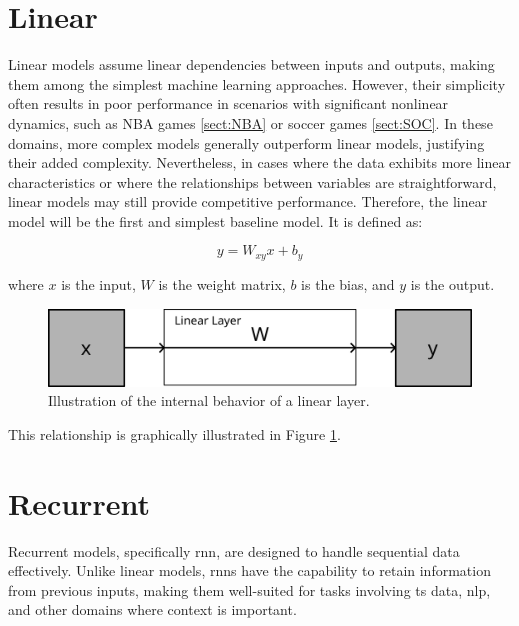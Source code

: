 \section{Linear}
\label{sect:linear}

Linear models assume linear dependencies between inputs and outputs, making them among the simplest machine learning approaches. However, their simplicity often results in poor performance in scenarios with significant nonlinear dynamics, such as NBA games \ref{sect:NBA} or soccer games \ref{sect:SOC}. In these domains, more complex models generally outperform linear models, justifying their added complexity. Nevertheless, in cases where the data exhibits more linear characteristics or where the relationships between variables are straightforward, linear models may still provide competitive performance. Therefore, the linear model will be the first and simplest baseline model. It is defined as:

\begin{equation}
    y = W_{xy}x + b_y
\end{equation}

where \( x \) is the input, \( W \) is the weight matrix, \( b \) is the bias, and \( y \) is the output.

\begin{figure}[t]
    \centering
    \includegraphics[width=\textwidth]{contents/Basics/linear.png}
    \caption{Illustration of the internal behavior of a linear layer.}
    \label{fig:linear-layer}
\end{figure}

 This relationship is graphically illustrated in Figure \ref{fig:linear-layer}.

\section{Recurrent}
\label{sect:rnn}

Recurrent models, specifically \gls{rnn}, are designed to handle sequential data effectively. Unlike linear models, \glspl{rnn} have the capability to retain information from previous inputs, making them well-suited for tasks involving \gls{ts} data, \gls{nlp}, and other domains where context is important.

